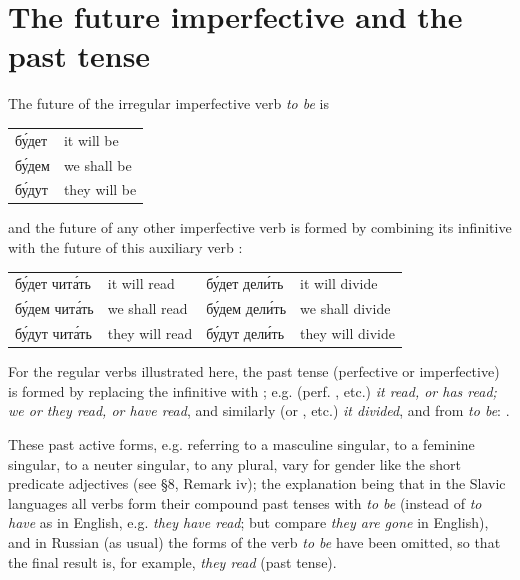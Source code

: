 \section{The future imperfective and the past tense}

The future of the irregular imperfective verb  \emph{to be} is
\begin{center}\small
\begin{tabular}{@{}>{\cyrillicfont}ll@{}}
бу́дет & it will be\\
бу́дем & we shall be\\
бу́дут & they will be
\end{tabular}\end{center}
and the future of any other imperfective verb is formed by combining its infinitive with the future of this auxiliary verb :
\begin{center}\small
\begin{tabular}{@{}>{\cyrillicfont}ll >{\cyrillicfont}ll@{}}
бу́дет чита́ть & it will read & бу́дет дели́ть & it will divide\\
бу́дем чита́ть & we shall read & бу́дем дели́ть & we shall divide\\
бу́дут чита́ть & they will read & бу́дут дели́ть & they will divide
\end{tabular}\end{center}

For the regular verbs illustrated here, the past tense (perfective or imperfective) is formed by replacing the infinitive  with ; e.g.  (perf. , etc.) \emph{it read, or has read; we or they read, or have read}, and similarly  (or , etc.) \emph{it divided}, and from  \emph{to be}: .

These past active forms, e.g.  referring to a masculine singular,  to a feminine singular,  to a neuter singular,  to any plural, vary for gender like the short predicate adjectives (see §8, Remark iv); the explanation being that in the Slavic languages all verbs form their compound past tenses with \emph{to be} (instead of \emph{to have} as in English, e.g. \emph{they have read}; but compare \emph{they are gone} in English), and in Russian (as usual) the forms of the verb \emph{to be} have been omitted, so that the final result is, for example,  \emph{they read} (past tense).

